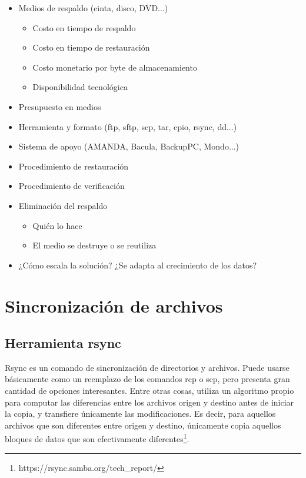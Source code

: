\begin{itemize}
\begin{itemize}
	\end{itemize}
	\item Medios de respaldo (cinta, disco, DVD...)
	\begin{itemize}
		\item Costo en tiempo de respaldo
		\item Costo en tiempo de restauración
		\item Costo monetario por byte de almacenamiento 
		\item Disponibilidad tecnológica
	\end{itemize}
	\item Presupuesto en medios
	\item Herramienta y formato (ftp, sftp, scp, tar, cpio, rsync, dd...)  
	\item Sistema de apoyo (AMANDA, Bacula, BackupPC, Mondo...)
	\item Procedimiento de restauración
	\item Procedimiento de verificación
	\item Eliminación del respaldo
	\begin{itemize}
		\item Quién lo hace
		\item El medio se destruye o se reutiliza 
	\end{itemize}
	\item ¿Cómo escala la solución? ¿Se adapta al crecimiento de los datos?
\end{itemize}

\section{Sincronización de archivos}

\subsection{Herramienta rsync}

Rsync es un comando de sincronización de directorios y archivos. Puede usarse básicamente como un reemplazo de los comandos rcp o scp, pero presenta gran cantidad de opciones interesantes. Entre otras cosas, utiliza un algoritmo propio para computar las diferencias entre los archivos origen y destino antes de iniciar la copia, y transfiere únicamente las modificaciones. Es decir, para aquellos archivos que son diferentes entre origen y destino, únicamente copia aquellos bloques de datos que son efectivamente diferentes\footnote{https://rsync.samba.org/tech\_report/}.

